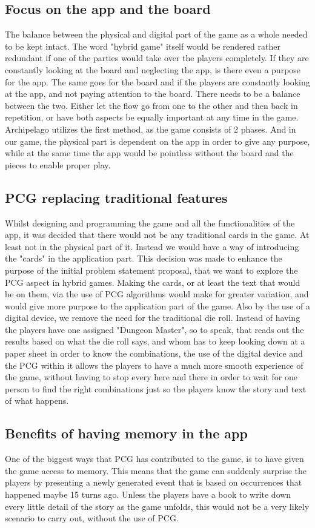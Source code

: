 \subsection{Focus on the app and the board}
The balance between the physical and digital part of the game as a whole needed to be kept intact. The word "hybrid game" itself would be rendered rather redundant if one of the parties would take over the players completely. If they are constantly looking at the board and neglecting the app, is there even a purpose for the app. The same goes for the board and if the players are constantly looking at the app, and not paying attention to the board. There needs to be a balance between the two. Either let the flow go from one to the other and then back in repetition, or have both aspects be equally important at any time in the game. Archipelago utilizes the first method, as the game consists of 2 phases. And in our game, the physical part is dependent on the app in order to give any purpose, while at the same time the app would be pointless without the board and the pieces to enable proper play.

\subsection{PCG replacing traditional features}
Whilst designing and programming the game and all the functionalities of the app, it was decided that there would not be any traditional cards in the game. At least not in the physical part of it. Instead we would have a way of introducing the "cards" in the application part. This decision was made to enhance the purpose of the initial problem statement proposal, that we want to explore the PCG aspect in hybrid games. Making the cards, or at least the text that would be on them, via the use of PCG algorithms would make for greater variation, and would give more purpose to the application part of the game. Also by the use of a digital device, we remove the need for the traditional die roll. Instead of having the players have one assigned "Dungeon Master", so to speak, that reads out the results based on what the die roll says, and whom has to keep looking down at a paper sheet in order to know the combinations, the use of the digital device and the PCG within it allows the players to have a much more smooth experience of the game, without having to stop every here and there in order to wait for one person to find the right combinations just so the players know the story and text of what happens.
\subsection{Benefits of having memory in the app}
One of the biggest ways that PCG has contributed to the game, is to have given the game access to memory. 
This means that the game can suddenly surprise the players by presenting a newly generated event that is based on 
occurrences that happened maybe 15 turns ago. Unless the players have a book to write down every little detail of 
the story as the game unfolds, this would not be a very likely scenario to carry out, without the use of PCG. 

